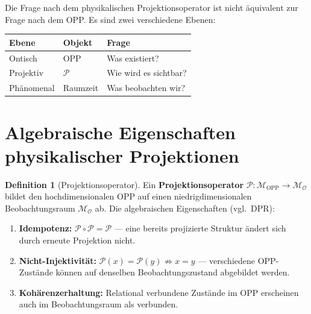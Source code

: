 \documentclass[11pt,a4paper]{article}
\theoremstyle{plain}
\theoremstyle{definition}
\newtheorem{definition}{Definition}[section]
\newcommand{\OPP}{\mathcal{M}_{\mathrm{OPP}}}
\newcommand{\Proj}{\mathcal{P}}
\begin{document}
Die Frage nach dem physikalischen Projektionsoperator ist nicht
\"{a}quivalent zur Frage nach dem OPP. Es sind zwei verschiedene
Ebenen:

\begin{center}
\begin{tabular}{lll}
  \toprule
  \textbf{Ebene} & \textbf{Objekt} & \textbf{Frage} \\
  \midrule
  Ontisch & OPP & Was existiert? \\
  Projektiv & $\Proj$ & Wie wird es sichtbar? \\
  Ph\"{a}nomenal & Raumzeit & Was beobachten wir? \\
  \bottomrule
\end{tabular}
\end{center}

\section{Algebraische Eigenschaften physikalischer Projektionen}

\begin{definition}[Projektionsoperator]
Ein \textbf{Projektionsoperator} $\Proj\colon \OPP \to
\mathcal{M}_{\mathcal{O}}$ bildet den hochdimensionalen OPP auf
einen niedrigdimensionalen Beobachtungsraum $\mathcal{M}_{\mathcal{O}}$
ab. Die algebraischen Eigenschaften (vgl.\ DPR):
\begin{enumerate}
  \item \textbf{Idempotenz:} $\Proj \circ \Proj = \Proj$ --- eine
        bereits projizierte Struktur \"{a}ndert sich durch erneute
        Projektion nicht.
  \item \textbf{Nicht-Injektivit\"{a}t:} $\Proj(x) = \Proj(y)
        \not\Rightarrow x = y$ --- verschiedene OPP-Zust\"{a}nde
        k\"{o}nnen auf denselben Beobachtungszustand abgebildet werden.
  \item \textbf{Koh\"{a}renzerhaltung:} Relational verbundene Zust\"{a}nde
        im OPP erscheinen auch im Beobachtungsraum als verbunden.
\end{enumerate}
\end{definition}
\end{document}
